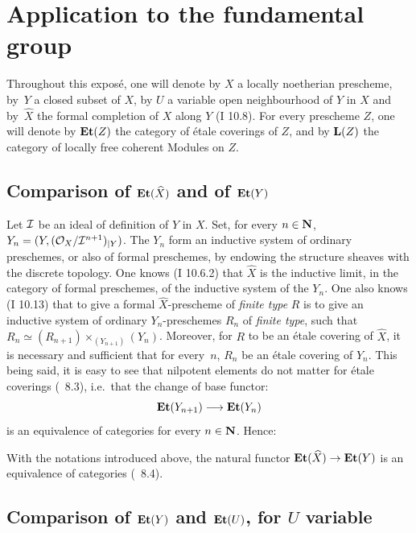 \chapter{Application to the fundamental group} \label{X}

\renewcommand{\theequation}{\arabic{equation}}

Throughout this expos\'e, one will denote by $X$ a locally noetherian
prescheme, by~$Y$ a closed subset of $X$, by $U$ a variable open
neighbourhood of $Y$ in $X$ and by~$\hat{X}$ the formal completion of
$X$ along $Y$ (\EGA I 10.8). For every prescheme $Z$, one will denote
by $\mathbf{Et}(Z)$ the category of \'etale coverings of $Z$, and by
$\mathbf{L}(Z)$\label{pX.1} the category of locally free coherent Modules on
$Z$.

%
\section{Comparison of $\mathbf{Et}(\widehat{X})$ and of $\mathbf{Et}(Y)$} \label{X.1}

Let ${\mathcal I}$ be an ideal of definition of $Y$ in $X$. Set, for every
$n\in\mathbf{N}$, $Y_n=(Y, (\mathcal{O}_X/{\mathcal I}^{n+1})_{|Y})$. The $Y_n$ form an inductive
system of ordinary preschemes, or also of formal preschemes, by
endowing the structure sheaves with the discrete topology. One knows
(\EGA I 10.6.2) that $\hat{X}$ is the inductive limit, in the category
of formal preschemes, of the inductive system of the $Y_n$. One also
knows (\EGA I 10.13) that to give a formal $\hat{X}$-prescheme of
\emph{finite type} $R$ is to give an inductive system of ordinary
$Y_n$-preschemes $R_n$ of \emph{finite type}, such that
$R_n\simeq(R_{n+1})\times_{(Y_{n+1})}(Y_n)$. Moreover, for $R$ to be an
\'etale covering of $\hat{X}$, it is necessary and sufficient that for
every~$n$, $R_n$ be an \'etale covering of $Y_n$. This being said, it
is easy to see that nilpotent elements do not matter for \'etale
coverings (~8.3), i.e.\ that the change of base functor:
\[
\Et(Y_{n+1}) \to \Et(Y_n)
\]
is an equivalence of categories for every $n\in\mathbf{N}$. Hence:

\begin{proposition} \label{X.1.1}
With the notations introduced above, the natural functor
$\Et(\hat{X})\to\Et(Y)$ is an equivalence of categories
(\cf \textup{~8.4}).
\end{proposition}

\section{Comparison of $\mathbf{Et}(Y)$ and $\mathbf{Et}(U)$, for $U$ variable} \label{X.2}

